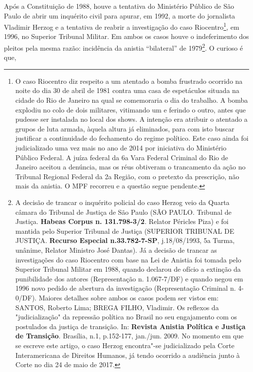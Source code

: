 Após a Constituição de 1988, houve a tentativa do Ministério Público de
São Paulo de abrir um inquérito civil para apurar, em 1992, a morte do
jornalista Vladimir Herzog e a tentativa de reabrir a investigação do
caso Riocentro\footnote{O caso Riocentro diz respeito a um atentado a
  bomba frustrado ocorrido na noite do dia 30 de abril de 1981 contra
  uma casa de espetáculos situada na cidade do Rio de Janeiro na qual se
  comemoraria o dia do trabalho. A bomba explodiu no colo de dois
  militares, vitimando um e ferindo o outro, antes que pudesse ser
  instalada no local dos shows. A intenção era atribuir o atentado a
  grupos de luta armada, àquela altura já eliminados, para com isto
  buscar justificar a continuidade do fechamento do regime político.
  Este caso ainda foi judicializado uma vez mais no ano de 2014 por
  iniciativa do Ministério Público Federal. A juíza federal da 6a Vara
  Federal Criminal do Rio de Janeiro aceitou a denúncia, mas os réus
  obtiveram o trancamento da ação no Tribunal Regional Federal da 2a
  Região, com o pretexto da prescrição, não mais da anistia. O MPF
  recorreu e a questão segue pendente.}, em 1996, no Superior Tribunal
Militar. Em ambos os casos houve o indeferimento dos pleitos pela mesma
razão: incidência da anistia ``bilateral'' de 1979\footnote{A decisão de
  trancar o inquérito policial do caso Herzog veio da Quarta câmara do
  Tribunal de Justiça de São Paulo (SÃO PAULO. Tribunal de Justiça.
  \textbf{Habeas Corpus n. 131.798-3/2}. Relator Péricles Piza) e foi
  mantida pelo Superior Tribunal de Justiça (SUPERIOR TRIBUNAL DE
  JUSTIÇA. \textbf{Recurso Especial n.33.782-7-SP}, j.18/08/1993, 5a
  Turma, unânime, Relator Ministro José Dantas). Já a decisão de trancar
  as investigações do caso Riocentro com base na Lei de Anistia foi
  tomada pelo Superior Tribunal Militar em 1988, quando declarou de
  ofício a extinção da punibilidade dos autores (Representação n.
  1.067-7/DF) e quando negou em 1996 novo pedido de abertura da
  investigação (Representação Criminal n. 4-0/DF). Maiores detalhes
  sobre ambos os casos podem ser vistos em: SANTOS, Roberto Lima; BREGA
  FILHO, Vladimir. Os reflexos da "judicialização" da repressão política
  no Brasil no seu engajamento com os postulados da justiça de
  transição. In: \textbf{Revista Anistia Política e Justiça de
  Transição}. Brasília, n.1, p.152-177, jan./jun. 2009. No momento em
  que se escreve este artigo, o caso Herzog encontra"-se judicializado
  pela Corte Interamericana de Direitos Humanos, já tendo ocorrido a
  audiência junto à Corte no dia 24 de maio de 2017.}. O curioso é que,
